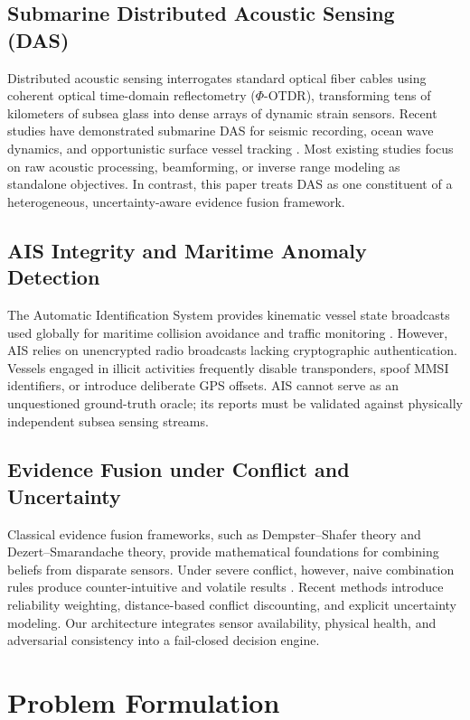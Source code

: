 \documentclass[conference]{IEEEtran}
\begin{document}
\subsection{Submarine Distributed Acoustic Sensing (DAS)}
Distributed acoustic sensing interrogates standard optical fiber cables using
coherent optical time-domain reflectometry ($\Phi$-OTDR), transforming tens of
kilometers of subsea glass into dense arrays of dynamic strain sensors. Recent
studies have demonstrated submarine DAS for seismic recording, ocean wave
dynamics, and opportunistic surface vessel tracking \cite{b11,b12,b13,b14,b15}.
Most existing studies focus on raw acoustic processing, beamforming, or inverse
range modeling as standalone objectives. In contrast, this paper treats DAS as
one constituent of a heterogeneous, uncertainty-aware evidence fusion framework.

\subsection{AIS Integrity and Maritime Anomaly Detection}
The Automatic Identification System provides kinematic vessel state broadcasts
used globally for maritime collision avoidance and traffic monitoring
\cite{b5,b6,b7}. However, AIS relies on unencrypted radio broadcasts lacking
cryptographic authentication. Vessels engaged in illicit activities frequently
disable transponders, spoof MMSI identifiers, or introduce deliberate GPS
offsets. AIS cannot serve as an unquestioned ground-truth oracle; its reports
must be validated against physically independent subsea sensing streams.

\subsection{Evidence Fusion under Conflict and Uncertainty}
Classical evidence fusion frameworks, such as Dempster--Shafer theory and
Dezert--Smarandache theory, provide mathematical foundations for combining
beliefs from disparate sensors. Under severe conflict, however, naive
combination rules produce counter-intuitive and volatile results \cite{b8,b9,b10}.
Recent methods introduce reliability weighting, distance-based conflict
discounting, and explicit uncertainty modeling. Our architecture integrates
sensor availability, physical health, and adversarial consistency into a
fail-closed decision engine.

\section{Problem Formulation}
\end{document}
